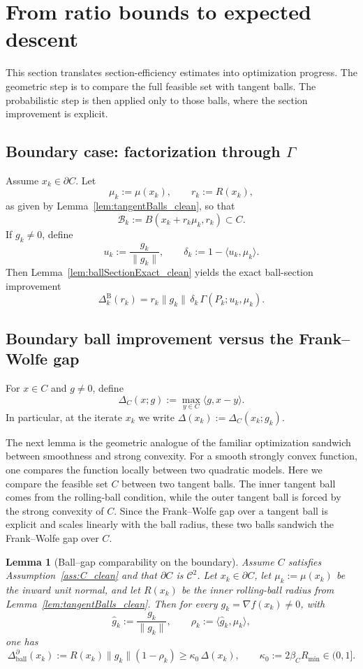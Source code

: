 \documentclass{article}
\newtheorem{lemma}{Lemma}
\begin{document}
\section{From ratio bounds to expected descent}
\label{app:expected-to-descent}
This section translates section-efficiency estimates into optimization
progress. The geometric step is to compare the full feasible set with tangent
balls. The probabilistic step is then applied only to those balls, where the
section improvement is explicit.
\subsection{Boundary case: factorization through $\Gamma$}

Assume $x_k\in\partial C$. Let
\[
\mu_k:=\mu(x_k),
\qquad
r_k:=R(x_k),
\]
as given by Lemma~\ref{lem:tangentBalls_clean}, so that
\[
\mathcal B_k:=B(x_k+r_k\mu_k,r_k)\subset C.
\]
If $g_k\neq 0$, define
\[
u_k:=\frac{g_k}{\|g_k\|},
\qquad
\delta_k:=1-\langle u_k,\mu_k\rangle.
\]
Then Lemma~\ref{lem:ballSectionExact_clean} yields the exact ball-section improvement
\begin{equation}
\Delta_k^{\mathrm B}(r_k)
=
r_k\|g_k\|\,\delta_k\,\Gamma(P_k;u_k,\mu_k).
\label{eq:BallImproveGamma_clean}
\end{equation}

\subsection{Boundary ball improvement versus the Frank--Wolfe gap}

For $x\in C$ and $g\neq 0$, define
\[
\Delta_C(x;g):=\max_{y\in C}\langle g,x-y\rangle.
\]
In particular, at the iterate $x_k$ we write $\Delta(x_k):=\Delta_C(x_k;g_k)$.


The next lemma is the geometric analogue of the familiar optimization
sandwich between smoothness and strong convexity. For a smooth strongly convex
function, one compares the function locally between two quadratic models. Here
we compare the feasible set \(C\) between two tangent balls. The inner tangent
ball comes from the rolling-ball condition, while the outer tangent ball is
forced by the strong convexity of \(C\). Since the Frank--Wolfe gap over a
tangent ball is explicit and scales linearly with the ball radius, these two
balls sandwich the Frank--Wolfe gap over \(C\).
\begin{lemma}[Ball--gap comparability on the boundary]
\label{lem:BallGap_clean}
Assume $C$ satisfies Assumption~\ref{ass:C_clean} and that $\partial C$ is $\mathcal{C}^2$. Let $x_k\in\partial C$, let $\mu_k:=\mu(x_k)$ be the inward unit normal, and let $R(x_k)$ be the inner rolling-ball radius from Lemma~\ref{lem:tangentBalls_clean}. Then for every $g_k=\nabla f(x_k)\neq 0$, with
\[
\hat g_k:=\frac{g_k}{\|g_k\|},
\qquad
\rho_k:=\langle \hat g_k,\mu_k\rangle,
\]
one has
\begin{equation}
\Delta_{\mathrm{ball}}^{\partial}(x_k)
:=
R(x_k)\|g_k\|(1-\rho_k)
\ge
\kappa_0\,\Delta(x_k),
\qquad
\kappa_0:=2\beta_C R_{\min}\in(0,1].
\label{eq:BallGap_boundary_clean}
\end{equation}
\end{lemma}
\end{document}
